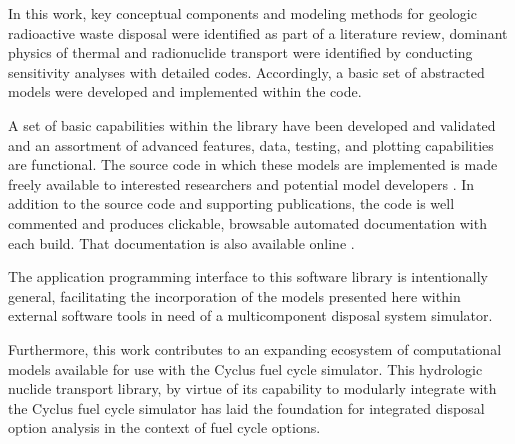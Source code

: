 In this work, key conceptual components and modeling methods for geologic
radioactive waste disposal were identified as part of a literature review,
dominant physics of thermal and radionuclide transport were identified by
conducting sensitivity analyses with detailed codes. Accordingly, a basic set
of abstracted models were developed and implemented within the \Cyder code.

A set of basic capabilities within the \Cyder library have been developed and
validated and an assortment of advanced features, data, testing, and plotting
capabilities are functional. The \Cyder source code in which these models are
implemented is made freely available to interested researchers and potential
model developers \cite{huff_cyder_2013}. In addition to the source code and
supporting publications, the \Cyder code is well commented and produces
clickable, browsable automated documentation with each build. That
documentation is also available online \cite{huff_cyder_2013}.

The application programming interface to this software library is intentionally
general, facilitating the incorporation of the models presented here within
external software tools in need of a multicomponent disposal system simulator.

Furthermore, this work contributes to an expanding ecosystem of computational
models available for use with the Cyclus fuel cycle simulator. This hydrologic
nuclide transport library, by virtue of its capability to modularly integrate
with the Cyclus fuel cycle simulator has laid the foundation for integrated
disposal option analysis in the context of fuel cycle options.
